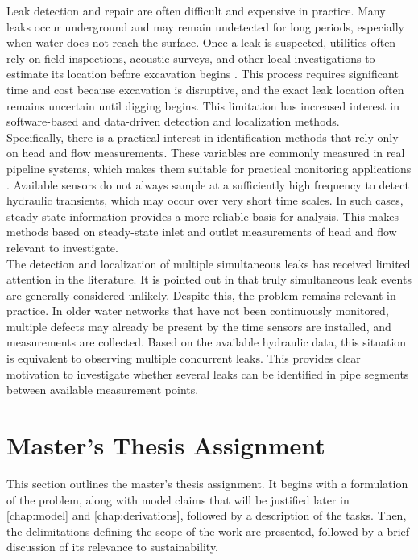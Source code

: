 Leak detection and repair are often difficult and expensive in practice. Many leaks occur underground and may remain undetected for long periods, especially when water does not reach the surface. Once a leak is suspected, utilities often rely on field inspections, acoustic surveys, and other local investigations to estimate its location before excavation begins \cite{hu2021review}. This process requires significant time and cost because excavation is disruptive, and the exact leak location often remains uncertain until digging begins. This limitation has increased interest in software-based and data-driven detection and localization methods.\\

Specifically, there is a practical interest in identification methods that rely only on head and flow measurements. These variables are commonly measured in real pipeline systems, which makes them suitable for practical monitoring applications \cite{hu2021review}. Available sensors do not always sample at a sufficiently high frequency to detect hydraulic transients, which may occur over very short time scales. In such cases, steady-state information provides a more reliable basis for analysis. This makes methods based on steady-state inlet and outlet measurements of head and flow relevant to investigate.\\

The detection and localization of multiple simultaneous leaks has received limited attention in the literature. It is pointed out in \cite{torres2024} that truly simultaneous leak events are generally considered unlikely. Despite this, the problem remains relevant in practice. In older water networks that have not been continuously monitored, multiple defects may already be present by the time sensors are installed, and measurements are collected. Based on the available hydraulic data, this situation is equivalent to observing multiple concurrent leaks. This provides clear motivation to investigate whether several leaks can be identified in pipe segments between available measurement points.

\newpage
\section{Master's Thesis Assignment}

This section outlines the master's thesis assignment. It begins with a formulation of the problem, along with model claims that will be justified later in \autoref{chap:model} and \autoref{chap:derivations}, followed by a description of the tasks. Then, the delimitations defining the scope of the work are presented, followed by a brief discussion of its relevance to sustainability.

